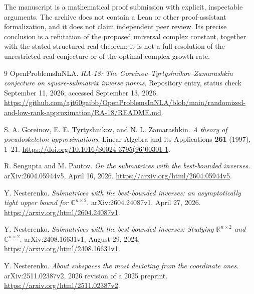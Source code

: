 \documentclass[11pt,letterpaper]{article}
\theoremstyle{definition}
\theoremstyle{remark}
\newcommand{\R}{\mathbb R}
\newcommand{\C}{\mathbb C}
\begin{document}
The manuscript is a mathematical proof submission with explicit, inspectable arguments. The archive does not contain a Lean or other proof-assistant formalization, and it does not claim independent peer review. Its precise conclusion is a refutation of the proposed universal complex constant, together with the stated structured real theorem; it is not a full resolution of the unrestricted real conjecture or of the optimal complex growth rate.

\clearpage
\begin{thebibliography}{9}
OpenProblemsInNLA.
\emph{RA-18: The Goreinov--Tyrtyshnikov--Zamarashkin conjecture on square-submatrix inverse norms}.
Repository entry, status check September 11, 2026; accessed September 13, 2026.
\url{https://github.com/ajt60gaibb/OpenProblemsInNLA/blob/main/randomized-and-low-rank-approximation/RA-18/README.md}.

S. A. Goreinov, E. E. Tyrtyshnikov, and N. L. Zamarashkin.
\emph{A theory of pseudoskeleton approximations}.
Linear Algebra and its Applications \textbf{261} (1997), 1--21.
\url{https://doi.org/10.1016/S0024-3795(96)00301-1}.

R. Sengupta and M. Pautov.
\emph{On the submatrices with the best-bounded inverses}.
arXiv:2604.05944v5, April 16, 2026.
\url{https://arxiv.org/html/2604.05944v5}.

Y. Nesterenko.
\emph{Submatrices with the best-bounded inverses: an asymptotically tight upper bound for $\C^{n\times2}$}.
arXiv:2604.24087v1, April 27, 2026.
\url{https://arxiv.org/html/2604.24087v1}.

Y. Nesterenko.
\emph{Submatrices with the best-bounded inverses: Studying $\R^{n\times2}$ and $\C^{n\times2}$}.
arXiv:2408.16631v1, August 29, 2024.
\url{https://arxiv.org/html/2408.16631v1}.

Y. Nesterenko.
\emph{About subspaces the most deviating from the coordinate ones}.
arXiv:2511.02387v2, 2026 revision of a 2025 preprint.
\url{https://arxiv.org/html/2511.02387v2}.
\end{thebibliography}
\end{document}

